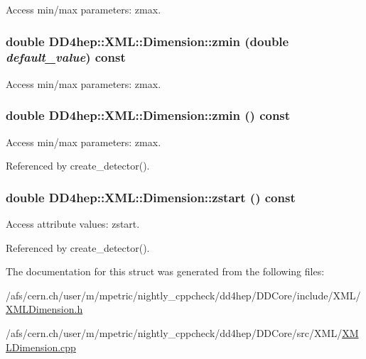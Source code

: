 Access min/max parameters: zmax. \hypertarget{struct_d_d4hep_1_1_x_m_l_1_1_dimension_a1debe4a51973d666f808073a38bdb919}{
\subsubsection[{zmin}]{\setlength{\rightskip}{0pt plus 5cm}double DD4hep::XML::Dimension::zmin (double {\em default\_\-value}) const}}
\label{struct_d_d4hep_1_1_x_m_l_1_1_dimension_a1debe4a51973d666f808073a38bdb919}


Access min/max parameters: zmax. \hypertarget{struct_d_d4hep_1_1_x_m_l_1_1_dimension_aa701509f25a3c37cf93fd8d41c8d43f2}{
\subsubsection[{zmin}]{\setlength{\rightskip}{0pt plus 5cm}double DD4hep::XML::Dimension::zmin () const}}
\label{struct_d_d4hep_1_1_x_m_l_1_1_dimension_aa701509f25a3c37cf93fd8d41c8d43f2}


Access min/max parameters: zmax. 

Referenced by create\_\-detector().\hypertarget{struct_d_d4hep_1_1_x_m_l_1_1_dimension_a0ed6fe74c9beeb7f1e5e856505917b31}{
\subsubsection[{zstart}]{\setlength{\rightskip}{0pt plus 5cm}double DD4hep::XML::Dimension::zstart () const}}
\label{struct_d_d4hep_1_1_x_m_l_1_1_dimension_a0ed6fe74c9beeb7f1e5e856505917b31}


Access attribute values: zstart. 

Referenced by create\_\-detector().

The documentation for this struct was generated from the following files:\begin{DoxyCompactItemize}
\item 
/afs/cern.ch/user/m/mpetric/nightly\_\-cppcheck/dd4hep/DDCore/include/XML/\hyperlink{_x_m_l_dimension_8h}{XMLDimension.h}\item 
/afs/cern.ch/user/m/mpetric/nightly\_\-cppcheck/dd4hep/DDCore/src/XML/\hyperlink{_x_m_l_dimension_8cpp}{XMLDimension.cpp}\end{DoxyCompactItemize}
